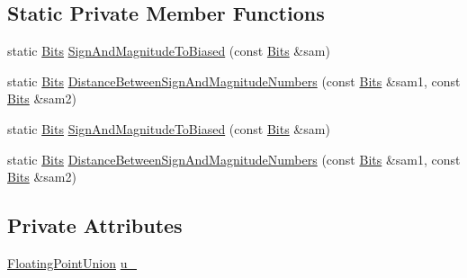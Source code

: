\subsection*{\-Static \-Private \-Member \-Functions}
\begin{DoxyCompactItemize}
\item 
static \hyperlink{classtesting_1_1internal_1_1FloatingPoint_adb12c064e30491d4976393880f9dca27}{\-Bits} \hyperlink{classtesting_1_1internal_1_1FloatingPoint_a872f90beea428c4e8d21a5677dd9d4e6}{\-Sign\-And\-Magnitude\-To\-Biased} (const \hyperlink{classtesting_1_1internal_1_1FloatingPoint_adb12c064e30491d4976393880f9dca27}{\-Bits} \&sam)
\item 
static \hyperlink{classtesting_1_1internal_1_1FloatingPoint_adb12c064e30491d4976393880f9dca27}{\-Bits} \hyperlink{classtesting_1_1internal_1_1FloatingPoint_a8a0a5fc8888097d7f464dc12d11ca60e}{\-Distance\-Between\-Sign\-And\-Magnitude\-Numbers} (const \hyperlink{classtesting_1_1internal_1_1FloatingPoint_adb12c064e30491d4976393880f9dca27}{\-Bits} \&sam1, const \hyperlink{classtesting_1_1internal_1_1FloatingPoint_adb12c064e30491d4976393880f9dca27}{\-Bits} \&sam2)
\item 
static \hyperlink{classtesting_1_1internal_1_1FloatingPoint_adb12c064e30491d4976393880f9dca27}{\-Bits} \hyperlink{classtesting_1_1internal_1_1FloatingPoint_a872f90beea428c4e8d21a5677dd9d4e6}{\-Sign\-And\-Magnitude\-To\-Biased} (const \hyperlink{classtesting_1_1internal_1_1FloatingPoint_adb12c064e30491d4976393880f9dca27}{\-Bits} \&sam)
\item 
static \hyperlink{classtesting_1_1internal_1_1FloatingPoint_adb12c064e30491d4976393880f9dca27}{\-Bits} \hyperlink{classtesting_1_1internal_1_1FloatingPoint_a8a0a5fc8888097d7f464dc12d11ca60e}{\-Distance\-Between\-Sign\-And\-Magnitude\-Numbers} (const \hyperlink{classtesting_1_1internal_1_1FloatingPoint_adb12c064e30491d4976393880f9dca27}{\-Bits} \&sam1, const \hyperlink{classtesting_1_1internal_1_1FloatingPoint_adb12c064e30491d4976393880f9dca27}{\-Bits} \&sam2)
\end{DoxyCompactItemize}
\subsection*{\-Private \-Attributes}
\begin{DoxyCompactItemize}
\item 
\hyperlink{uniontesting_1_1internal_1_1FloatingPoint_1_1FloatingPointUnion}{\-Floating\-Point\-Union} \hyperlink{classtesting_1_1internal_1_1FloatingPoint_a7ba7d6be838cfc2c8bbdc327f5016d83}{u\-\_\-}
\end{DoxyCompactItemize}


